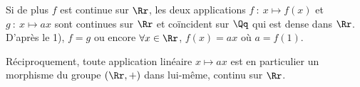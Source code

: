 {\begin{enumerate}
{Si de plus $f$ est continue sur $\Rr$, les deux applications $f~:~x\mapsto f(x)$ et $g~:~x\mapsto ax$ sont continues sur $\Rr$ et coïncident sur $\Qq$ qui est dense dans $\Rr$. D'après le 1), $f = g$ ou encore $\forall x\in\Rr$, $f(x)=ax$ où $a=f(1)$.

Réciproquement, toute application linéaire $x\mapsto ax$ est en particulier un morphisme du groupe $(\Rr,+)$ dans lui-même, continu sur $\Rr$. 

\begin{center}
\end{center}}
\end{enumerate}
}